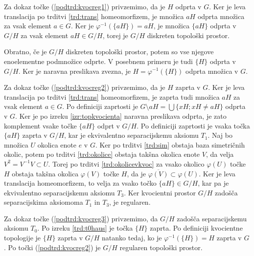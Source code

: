\documentclass[mat1]{fmfdelo}
\newcommand{\closure}[1]{\overline{#1}}
\begin{document}
\begin{dokaz}
Za dokaz točke (\ref{podtrd:kvocreg1}) privzemimo, da je $H$ odprta v $G$. Ker je leva translacija po trditvi \ref{trd:trans} homeomorfizem, je množica $aH$ odprta množica za vsak element $a \in G$. Ker je $\varphi^{-1}(\lbrace aH \rbrace) = aH$, je množica $\lbrace aH \rbrace$ odprta v $G/H$ za vsak element $aH \in G/H$, torej je $G/H$ diskreten topološki prostor.

Obratno, če je $G/H$ diskreten topološki prostor, potem so vse njegove eno\-e\-le\-ment\-ne podmnožice odprte. V posebnem primeru je tudi $\lbrace H \rbrace$ odprta v $G/H$. Ker je naravna preslikava zvezna, je $H = \varphi^{-1}(\lbrace H \rbrace)$ odprta množica v $G$.

Za dokaz točke (\ref{podtrd:kvocreg2}) privzemimo, da je $H$ zaprta v $G$. Ker je leva translacija po trditvi \ref{trd:trans} homeomorfizem, je zaprta tudi množica $aH$ za vsak element $a \in G$. Po definiciji zaprtosti je $G\setminus aH = \bigcup \lbrace xH ; xH \neq aH \rbrace$ odprta v $G$. Ker je po izreku \ref{izr:topkvocienta} naravna preslikava odprta, je zato komplement vsake točke $\lbrace aH \rbrace$ odprt v $G/H$. Po definiciji zaprtosti je vsaka točka $\lbrace aH \rbrace$ zaprta v $G/H$, kar je ekvivalentno separacijskemu aksiomu $T_1$. 
Naj bo množica $U$ okolica enote $e$ v $G$. Ker po trditvi \ref{trd:sim} obstaja baza simetričnih okolic, potem po trditvi \ref{trd:okolice} obstaja takšna okolica enote $V$, da velja $V^2 = V^{-1}V \subset U$. Torej po trditvi \ref{trd:okolicevkvoc} za vsako okolico $\varphi(U)$ točke $H$ obstaja takšna okolica $\varphi(V)$ točke $H$, da je $\closure{\varphi(V)} \subset \varphi(U)$.
Ker je leva translacija homeomorfizem, to velja za vsako točko $\lbrace aH \rbrace \in G/H$, kar pa je ekvivalentno separacijskemu aksiomu $T_3$. Ker kvocientni prostor $G/H$ zadošča separacijskima aksiomoma $T_1$ in $T_3$, je regularen.

Za dokaz točke (\ref{podtrd:kvocreg3}) privzemimo, da $G/H$ zadošča separacijskemu aksiomu $T_0$. Po izreku \ref{trd:t0haus} je točka $\lbrace H \rbrace$ zaprta. Po definiciji kvocientne topologije je $\lbrace H \rbrace$ zaprta v $G/H$ natanko tedaj, ko je $\varphi^{-1}(\lbrace H \rbrace) = H$ zaprta v $G$. Po točki (\ref{podtrd:kvocreg2}) je $G/H$ regularen topološki prostor.
\end{dokaz}
\end{document}
